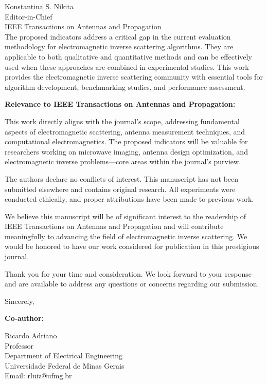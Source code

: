 \documentclass[11pt]{letter}
\begin{document}
\begin{letter}{
Konstantina S. Nikita\\
Editor-in-Chief\\
IEEE Transactions on Antennas and Propagation\\
}
The proposed indicators address a critical gap in the current evaluation methodology for electromagnetic inverse scattering algorithms. They are applicable to both qualitative and quantitative methods and can be effectively used when these approaches are combined in experimental studies. This work provides the electromagnetic inverse scattering community with essential tools for algorithm development, benchmarking studies, and performance assessment.


\textbf{Relevance to IEEE Transactions on Antennas and Propagation:}

This work directly aligns with the journal's scope, addressing fundamental aspects of electromagnetic scattering, antenna measurement techniques, and computational electromagnetics. The proposed indicators will be valuable for researchers working on microwave imaging, antenna design optimization, and electromagnetic inverse problems—core areas within the journal's purview.

The authors declare no conflicts of interest. This manuscript has not been submitted elsewhere and contains original research. All experiments were conducted ethically, and proper attributions have been made to previous work.

We believe this manuscript will be of significant interest to the readership of IEEE Transactions on Antennas and Propagation and will contribute meaningfully to advancing the field of electromagnetic inverse scattering. We would be honored to have our work considered for publication in this prestigious journal.

Thank you for your time and consideration. We look forward to your response and are available to address any questions or concerns regarding our submission.

\closing{Sincerely,}

\vspace{1cm}

\noindent
\textbf{Co-author:}

\vspace{0.5cm}

\noindent
Ricardo Adriano\\
Professor\\
Department of Electrical Engineering\\
Universidade Federal de Minas Gerais\\
Email: rluiz@ufmg.br

\end{letter}
\end{document}
